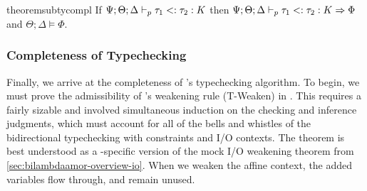 \begin{restatable}{theorem}{subtycompl}
If $\Psi ; \Theta ; \Delta \vdash_p \tau_1 <: \tau_2 : K$ then  $\Psi ; \Theta ; \Delta \vdash_p \tau_1 <: \tau_2 : K \Rightarrow \Phi$ and $\Theta ; \Delta \vDash \Phi$.
\label{thm:subty-compl}
\end{restatable}

\subsubsection{Completeness of Typechecking}

Finally, we arrive at the completeness of \bilambdaamor's typechecking algorithm. To begin, we must prove the admissibility of \dlambdaamor's weakening rule (T-Weaken) in \bilambdaamor. This requires a fairly sizable and involved simultaneous induction on the checking and inference judgments, which must account for all of the bells and whistles of the bidirectional typechecking with constraints and I/O contexts. The theorem is best understood as a \bilambdaamor -specific version of the mock I/O weakening theorem from \autoref{sec:bilambdaamor-overview-io}. When we weaken the affine context, the added variables flow through, and remain unused.


